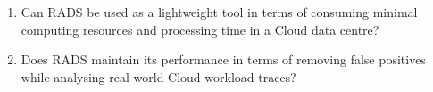 \begin{enumerate}[{(1)}]
\item Can RADS be used as a lightweight tool in terms of consuming minimal computing resources and processing time in a Cloud data centre? %
\item Does RADS maintain its performance in terms of removing false positives while analysing real-world Cloud workload traces?
\end{enumerate}

